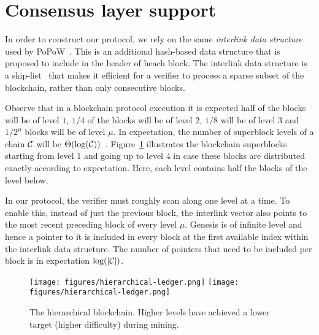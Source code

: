 \section{Consensus layer support} \label{sec.consensus}

\label{sec.interlink}

In order to construct our protocol, we rely on the same \emph{interlink data structure} used by PoPoW~\cite{KLS}. This is an
additional hash-based data structure that is proposed to include in the header of heach block.
The interlink data structure is a skip-list~\cite{skiplist} that makes it efficient for a verifier to process a sparse subset of the blockchain, rather than only consecutive blocks.


Observe that in a
blockchain protocol execution it is expected half of the blocks will be of level
$1$, $1/4$ of the blocks will be of level $2$, $1/8$ will be of level $3$ and
$1/2^\mu$ blocks will be of level $\mu$. In expectation, the number of
superblock levels of a chain $\mathcal{C}$ will be $\Theta(\log(\mathcal{C}))$~\cite{KLS}.
Figure~\ref{fig.hierarchy} illustrates the blockchain superblocks starting from
level $1$ and going up to level $4$ in case these blocks are distributed exactly
according to expectation. Here, each level contains half the blocks of the level
below.

In our protocol, the verifier must roughly scan along one level at a time.
To enable this,
instead of just the previous block, the interlink vector also points to
the most recent preceding block of every level $\mu$.
Genesis is of infinite level and hence a pointer to it
is included in every block at the first available index within the interlink
data structure. The number of pointers that need
to be included per block is in expectation $\log(|\mathcal{C}|)$.

\begin{figure}
    \caption{The hierarchical blockchain.
    Higher levels have achieved a lower target (higher difficulty) during mining.}
    \centering
    \iftwocolumn
        \texttt{[image: figures/hierarchical-ledger.png]}
    \else
        \texttt{[image: figures/hierarchical-ledger.png]}
    \fi
    \label{fig.hierarchy}
\end{figure}

